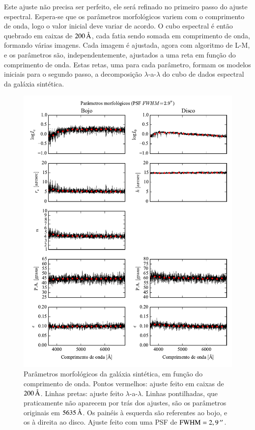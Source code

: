 Este ajuste não precisa ser perfeito, ele será refinado no primeiro passo do
ajuste espectral. Espera-se que os  parâmetros morfológicos variem com o
comprimento de onda, logo o valor inicial deve variar de acordo. O cubo
espectral é então quebrado em caixas de $200\,\text{\normalfont\AA}$, cada fatia sendo
somada em comprimento de onda, formando várias imagens. Cada imagem é ajustada,
agora com algoritmo de L-M, e os parâmetros são, independentemente, ajustados a
uma reta em função do comprimento de onda. Estas retas, uma para cada parâmetro,
formam os modelos iniciais para o segundo passo, a decomposição
$\lambda$-a-$\lambda$ do cubo de dados espectral da galáxia sintética.

\begin{figure}
	\includegraphics{figuras/simulation_fitparams}
	\caption[Parâmetros morfológicos da galáxia sintética.]
	{Parâmetros morfológicos da galáxia sintética, em função do comprimento de
	onda. Pontos vermelhos: ajuste feito em caixas de $200\,\text{\normalfont\AA}$. Linhas
	pretas: ajuste feito $\lambda$-a-$\lambda$. Linhas pontilhadas, que
	praticamente não aparecem por trás dos ajustes, são os parâmetros originais em
	$5635\,\text{\normalfont\AA}$. Os painéis à esquerda são referentes ao bojo, e os à direita
	ao disco. Ajuste feito com uma PSF de $\mathrm{FWHM} = 2,9\,^{\prime\prime}$.
	}
	\label{fig:testFitParams}
\end{figure}

